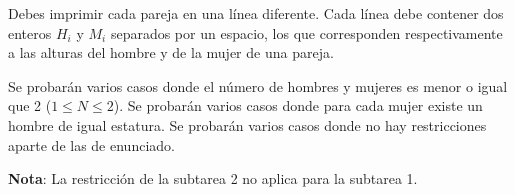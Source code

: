 \documentclass{oci}
\begin{document}
\begin{outputDescription}
Debes imprimir cada pareja en una línea diferente.
Cada línea debe contener dos enteros $H_i$ y $M_i$ separados por un espacio,
los que corresponden respectivamente a las alturas del hombre y de la mujer de
una pareja.
\end{outputDescription}

\begin{scoreDescription}
   Se probarán varios casos donde el número de hombres y mujeres es menor o igual que 2 ($1 \leq N \leq 2$).
   Se probarán varios casos donde para cada mujer existe un hombre de igual estatura.
   Se probarán varios casos donde no hay restricciones aparte de las de enunciado.

\textbf{Nota}: La restricción de la subtarea 2 no aplica para la subtarea 1.
\end{scoreDescription}

\begin{sampleDescription}
\end{sampleDescription}
\end{document}
